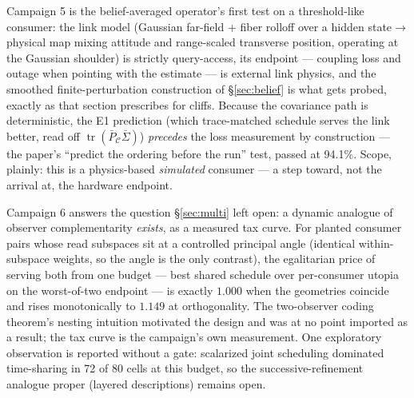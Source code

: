 \documentclass{article}
\theoremstyle{definition}
\theoremstyle{remark}
\newcommand{\PCb}{\bar P_{\mathcal{C}}}
\newcommand{\tr}{\operatorname{tr}}
\newcommand{\Sig}{\Sigma}
\begin{document}
Campaign 5 is the belief-averaged operator's first test on a
threshold-like consumer: the link model (Gaussian far-field + fiber
rolloff over a hidden state$\to$physical map mixing attitude and
range-scaled transverse position, operating at the Gaussian shoulder) is
strictly query-access, its endpoint --- coupling loss and outage when
pointing with the estimate --- is external link physics, and the smoothed
finite-perturbation construction of \S\ref{sec:belief} is what gets
probed, exactly as that section prescribes for cliffs. Because the
covariance path is deterministic, the E1 prediction (which trace-matched
schedule serves the link better, read off $\tr(\PCb\bar\Sig)$)
\emph{precedes} the loss measurement by construction --- the paper's
``predict the ordering before the run'' test, passed at 94.1\%. Scope,
plainly: this is a physics-based \emph{simulated} consumer --- a step
toward, not the arrival at, the hardware endpoint.

Campaign 6 answers the question \S\ref{sec:multi} left open: a dynamic
analogue of observer complementarity \emph{exists}, as a measured tax
curve. For planted consumer pairs whose read subspaces sit at a controlled
principal angle (identical within-subspace weights, so the angle is the
only contrast), the egalitarian price of serving both from one budget ---
best shared schedule over per-consumer utopia on the worst-of-two
endpoint --- is exactly $1.000$ when the geometries coincide and rises
monotonically to $1.149$ at orthogonality. The two-observer coding
theorem's nesting intuition motivated the design and was at no point
imported as a result; the tax curve is the campaign's own measurement.
One exploratory observation is reported without a gate: scalarized joint
scheduling dominated time-sharing in 72 of 80 cells at this budget, so the
successive-refinement analogue proper (layered descriptions) remains open.
\end{document}
